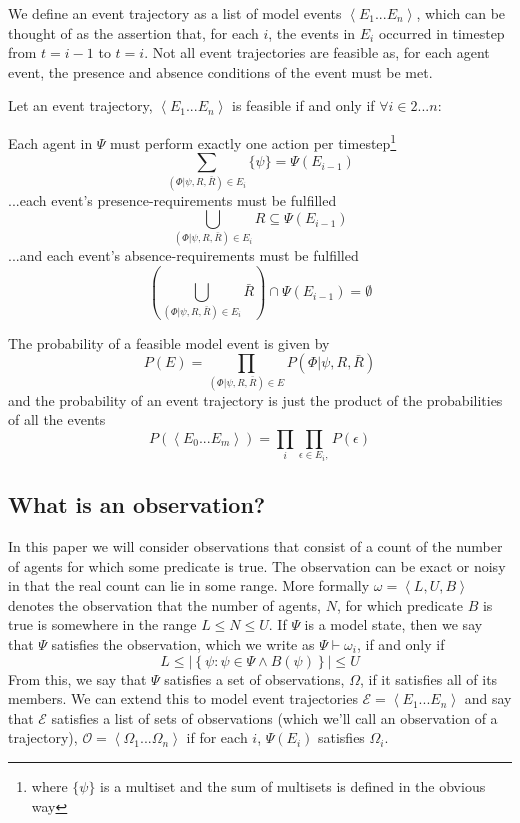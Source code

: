 \documentclass{article}
\begin{document}
We define an event trajectory as a list of model events $\left<E_1...E_n\right>$, which can be thought of as the assertion that, for each $i$, the events in $E_i$ occurred in timestep from $t=i-1$ to $t=i$. Not all event trajectories are feasible as, for each agent event, the presence and absence conditions of the event must be met.

Let an event trajectory, $\left<E_1...E_n\right>$ is feasible if and only if $\forall i\in 2...n:$

Each agent in $\Psi$ must perform exactly one action per timestep\footnote{where $\{\psi\}$ is a multiset and the sum of multisets is defined in the obvious way}
\begin{equation}
\sum_{(\Phi|\psi,R,\bar{R})\in E_i}\{\psi\} = \Psi(E_{i-1})
\label{agency}
\end{equation}
...each event's presence-requirements must be fulfilled
\[
\bigcup_{(\Phi|\psi,R,\bar{R})\in E_i} R \subseteq \Psi(E_{i-1})
\]
...and each event's absence-requirements must be fulfilled
\[
\left(\bigcup_{(\Phi|\psi,R,\bar{R})\in E_i} \bar{R}\right) \cap \Psi(E_{i-1}) = \emptyset
\]


The probability of a feasible model event is given by
\[
P(E) = \prod_{(\Phi|\psi,R,\bar{R}) \in E} P(\Phi|\psi,R,\bar{R})
\]
and the probability of an event trajectory is just the product of the probabilities of all the events
\[
P(\left<E_0...E_m\right>) = \prod_{i}\prod_{\epsilon\in E_i, }P(\epsilon)
\]


\subsection{What is an observation?}

In this paper we will consider observations that consist of a count of the number of agents for which some predicate is true. The observation can be exact or noisy in that the real count can lie in some range. More formally $\omega = \left<L,U,B\right>$ denotes the observation that the number of agents, $N$, for which predicate $B$ is true is somewhere in the range  $L \le N \le U$. If $\Psi$ is a model state,  then we say that $\Psi$ satisfies the observation, which we write as $\Psi \vdash \omega_i$, if and only if
\[
L \le \left|\left\{\psi:\psi \in \Psi \wedge B(\psi)\right\}\right| \le U
\]
From this, we say that $\Psi$ satisfies a set of observations, $\Omega$, if it satisfies all of its members. We can extend this to model event trajectories $\mathcal{E} = \left<E_1...E_n\right>$ and say that $\mathcal{E}$ satisfies a list of sets of observations (which we'll call an observation of a trajectory), $\mathcal{O} = \left<\Omega_1...\Omega_n\right>$ if for each $i$, $\Psi(E_i)$ satisfies $\Omega_i$.
\end{document}
